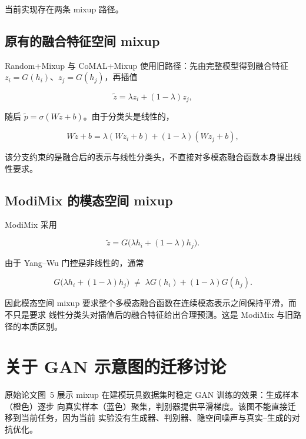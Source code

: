 \documentclass[11pt,a4paper]{article}
\theoremstyle{definition}
\begin{document}
当前实现存在两条 mixup 路径。

\subsection{原有的融合特征空间 mixup}

Random+Mixup 与 CoMAL+Mixup 使用旧路径：先由完整模型得到融合特征
$z_i=G(h_i)$、$z_j=G(h_j)$，再插值

\begin{equation}
  \tilde{z}=\lambda z_i+(1-\lambda)z_j,
  \label{eq:fused-mix}
\end{equation}

随后 $\tilde{p}=\sigma(W\tilde{z}+b)$。由于分类头是线性的，

\begin{equation}
  W\tilde{z}+b=\lambda(Wz_i+b)+(1-\lambda)(Wz_j+b),
  \label{eq:fused-linear}
\end{equation}

该分支约束的是融合后的表示与线性分类头，不直接对多模态融合函数本身提出线性要求。

\subsection{ModiMix 的模态空间 mixup}

ModiMix 采用

\begin{equation}
  \tilde{z}=G\bigl(\lambda h_i+(1-\lambda)h_j\bigr).
  \label{eq:modality-mix}
\end{equation}

由于 Yang--Wu 门控是非线性的，通常

\begin{equation}
  G\bigl(\lambda h_i+(1-\lambda)h_j\bigr)\;\neq\;\lambda G(h_i)+(1-\lambda)G(h_j).
  \label{eq:gate-nonlinear}
\end{equation}

因此模态空间 mixup 要求整个多模态融合函数在连续模态表示之间保持平滑，而不只是要求
线性分类头对插值后的融合特征给出合理预测。这是 ModiMix 与旧路径的本质区别。

\section{关于 GAN 示意图的迁移讨论}
\label{sec:gan}

原始论文图~5 展示 mixup 在建模玩具数据集时稳定 GAN 训练的效果：生成样本（橙色）逐步
向真实样本（蓝色）聚集，判别器提供平滑梯度。该图不能直接迁移到当前任务，因为当前
实验没有生成器、判别器、隐空间噪声与真实--生成的对抗优化。
\end{document}
